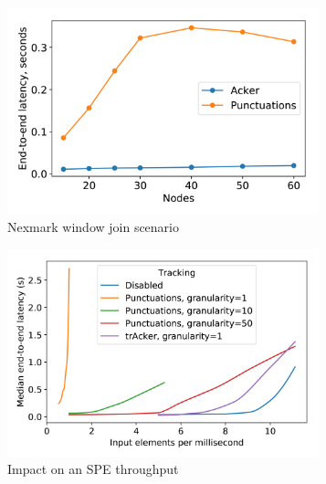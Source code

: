 \begin{figure}[t!]
    \begin{subfigure}[b]{0.3\textwidth}
            \includegraphics[width=0.99\textwidth]{pics/nexmark.png}
            \caption{Nexmark window join scenario}
            \label{fig:nexmark}
    \end{subfigure}
    \hspace{5mm}
    \begin{subfigure}[b]{0.3\textwidth}
            \includegraphics[width=0.99\textwidth]{pics/throughput_overhead_50.png}
            \caption{Impact on an SPE throughput}
            \label{throughput_overhead}
    \end{subfigure}
    \hspace{5mm}
    \begin{subfigure}[b]{0.3\textwidth}

\end{subfigure}
\end{figure}
